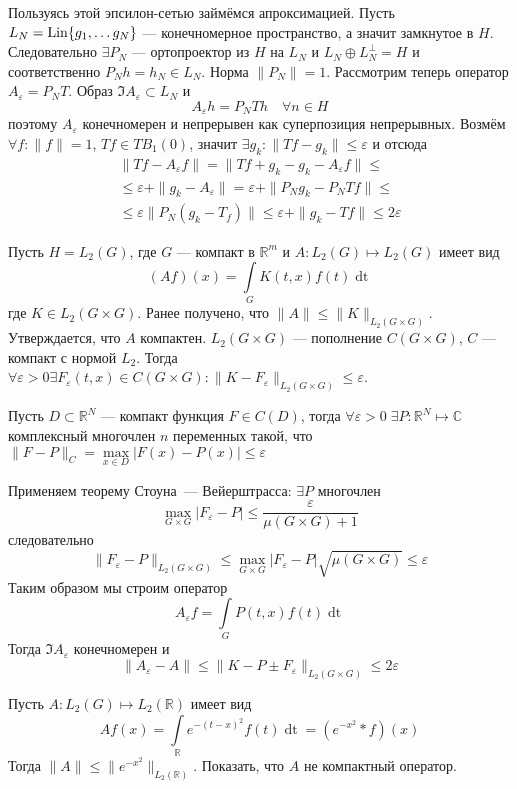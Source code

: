 \documentclass[14pt]{extarticle}
\begin{document}
\begin{Proof}
    Пользуясь этой эпсилон-сетью займёмся апроксимацией.
    Пусть $L_N = \operatorname{Lin} \{g_1,\dots g_N\}$ --- конечномерное пространство, а
    значит замкнутое в $H$.
    Следовательно $\exists P_N$ --- ортопроектор из $H$ на $L_N$ и 
    $L_N \oplus L_N^\perp = H$ и соответственно $P_N h = h_N \in L_N$.
    Норма $\|P_N\| = 1$.
    Рассмотрим теперь оператор $A_\varepsilon = P_N T$.
    Образ $\Im A_\varepsilon \subset L_N$ и
    $$
    A_\varepsilon h = P_N T h \quad \forall n \in H
    $$
    поэтому $A_\varepsilon$ конечномерен и непрерывен как суперпозиция 
    непрерывных.
    Возмём $\forall f\colon \|f\| = 1$, $Tf \in TB_1(0)$, значит
    $\exists g_k\colon \|Tf - g_k\| \le \varepsilon$ и отсюда
    \begin{multline*}
    \|Tf - A_\varepsilon f\| = \|Tf + g_k - g_k - A_\varepsilon f\| \le \\ \le
    \varepsilon + \|g_k - A_\varepsilon\| = \varepsilon + \|P_N g_k - P_N T f\|
    \le \\ \le\varepsilon  \|P_N(g_k - T_f)\| \le \varepsilon + \|g_k - Tf\| 
    \le 2 \varepsilon 
    \end{multline*}
\end{Proof}
\begin{Prim}
    Пусть $H = L_2(G)$, где $G$ --- компакт в $\mathbb R^m$ и $A : L_2(G)
    \mapsto L_2(G)$ имеет вид
    $$
    (Af)(x) = \int\limits_G K(t, x)f(t)\mathop{dt}
    $$
    где $K \in L_2(G \times G)$.
    Ранее получено, что $\|A\| \le \|K\|_{L_2(G \times G)}$.
    Утверждается, что $A$ компактен.
    $L_2(G \times G)$ --- пополнение $C(G \times G)$, $C$ --- компакт с нормой
    $L_2$.
    Тогда $\forall \varepsilon > 0 \exists F_\varepsilon(t, x) \in
    C(G \times G)\colon \|K - F_\varepsilon\|_{L_2(G \times G)} \le 
    \varepsilon$.
    \begin{Theor}
        Пусть $D \subset \mathbb R^N$ --- компакт функция $F \in C(D)$, тогда
        $\forall \varepsilon > 0\; \exists P : \mathbb R^N \mapsto \mathbb C$
        комплексный многочлен $n$ переменных такой, что
        $\|F - P\|_C = \max\limits_{x \in D} |F(x) - P(x)| \le \varepsilon$
    \end{Theor}
    
    Применяем теорему Стоуна~--- Вейерштрасса: $\exists P$ многочлен
    $$
    \max_{G \times G}|F_\varepsilon - P| \le \dfrac{\varepsilon}{\mu(G \times 
    G) + 1}
    $$
    следовательно
    $$
    \|F_\varepsilon - P\|_{L_2(G \times G)} \le \max_{G \times G}|F_\varepsilon 
    - P|\sqrt{\mu(G \times G)} \le \varepsilon
    $$
    Таким образом мы строим оператор
    $$
    A_\varepsilon f = \int \limits_G P(t, x) f(t) \mathop{dt}
    $$
    Тогда $\Im A_\varepsilon$ конечномерен и
    $$
    \|A_\varepsilon - A\| \le \|K - P \pm F_\varepsilon\|_{L_2(G \times G)} \le
    2 \varepsilon
    $$
\end{Prim}
\begin{Upr}
    Пусть $A : L_2(G) \mapsto L_2(\mathbb R)$ имеет вид
    $$
    Af(x) = \int\limits_{\mathbb R} e^{-(t - x)^2}f(t)\mathop{dt} = (e^{-x^2} *
    f)(x)
    $$
    Тогда $\|A\| \le \|e^{-x^2}\|_{L_2(\mathbb R)}$. 
    Показать, что $A$ не компактный оператор.
\end{Upr}
\end{document}
